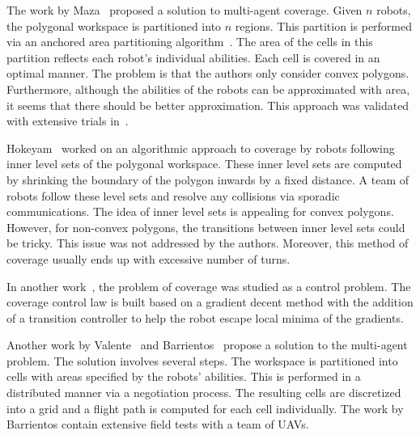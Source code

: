 \documentclass[../main.tex]{subfiles}
\begin{document}
The work by Maza~\cite{maza2007multiple} proposed a solution to multi-agent coverage. Given $n$ robots, the polygonal workspace is partitioned into $n$ regions. This partition is performed via an anchored area partitioning algorithm~\cite{hert1998polygon}. The area of the cells in this partition reflects each robot's individual abilities. Each cell is covered in an optimal manner. The problem is that the authors only consider convex polygons. Furthermore, although the abilities of the robots can be approximated with area, it seems that there should be better approximation. This approach was validated with extensive trials in~\cite{barrientos2011aerial}.


Hokeyam~\cite{hokayem2007dynamic} worked on an algorithmic approach to coverage by robots following inner level sets of the polygonal workspace. These inner level sets are computed by shrinking the boundary of the polygon inwards by a fixed distance. A team of robots follow these level sets and resolve any collisions via sporadic communications. The idea of inner level sets is appealing for convex polygons. However, for non-convex polygons, the transitions between inner level sets could be tricky. This issue was not addressed by the authors. Moreover, this method of coverage usually ends up with excessive number of turns.

In another work~\cite{atincc2013supervised}, the problem of coverage was studied as a control problem. The coverage control law is built based on a gradient decent method with the addition of a transition controller to help the robot escape local minima of the gradients. 

Another work by Valente~\cite{valente2011multi} and Barrientos~\cite{barrientos2011aerial} propose a solution to the multi-agent problem. The solution involves several steps. The workspace is partitioned into cells with areas specified by the robots' abilities. This is performed in a distributed manner via a negotiation process. The resulting cells are discretized into a grid and a flight path is computed for each cell individually. The work by Barrientos contain extensive field tests with a team of UAVs.
\end{document}
